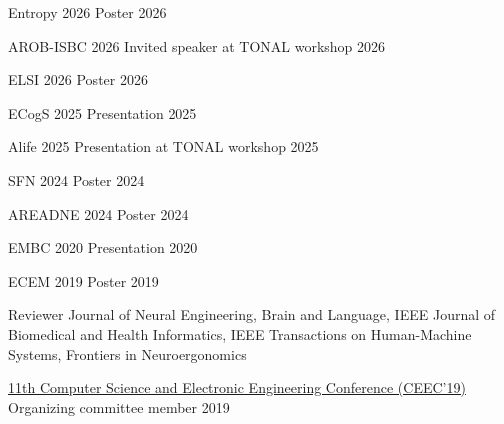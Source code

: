 

\begin{cvhonors}
	
	\cvhonor
	{Entropy 2026} %
	{Poster} %
	{} %
	{2026} %
	
	\cvhonor
	{AROB-ISBC 2026} %
	{Invited speaker at TONAL workshop} %
	{} %
	{2026} %
	
	\cvhonor
	{ELSI 2026} %
	{Poster} %
	{} %
	{2026} %

	\cvhonor
	{ECogS 2025} %
	{Presentation} %
	{} %
	{2025} %

	\cvhonor
	{Alife 2025} %
	{Presentation at TONAL workshop} %
	{} %
	{2025} %

	\cvhonor
	{SFN 2024} %
	{Poster} %
	{} %
	{2024} %

	\cvhonor
	{AREADNE 2024} %
	{Poster} %
	{} %
	{2024} %

	\cvhonor
	{EMBC 2020} %
	{Presentation} %
	{} %
	{2020} %

	\cvhonor
	{ECEM 2019} %
	{Poster} %
	{} %
	{2019} %

\end{cvhonors}




\begin{cvhonors}

\cvhonor
{Reviewer} %
{Journal of Neural Engineering, Brain and Language, IEEE Journal of Biomedical and Health Informatics, IEEE Transactions on Human-Machine Systems, Frontiers in Neuroergonomics} %
{} %
{} %

\cvhonor
{\href{https://ceec.uk}{11th Computer Science and Electronic Engineering Conference (CEEC'19)}} %
{Organizing committee member} %
{} %
{2019} %

\end{cvhonors}
